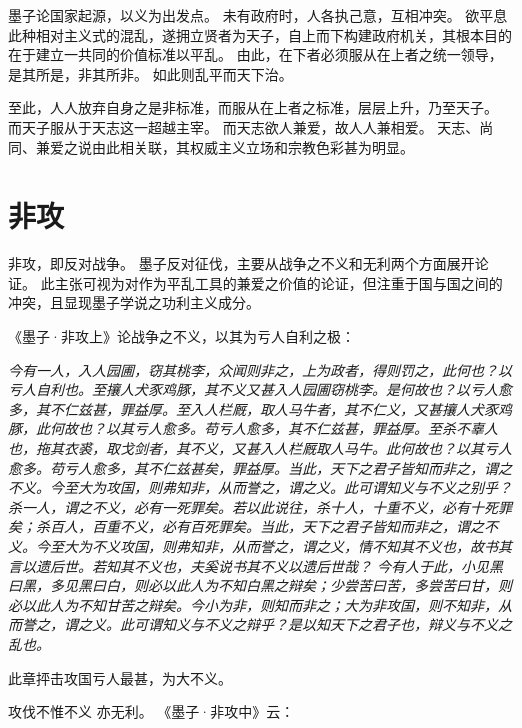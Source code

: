 \documentclass[11pt]{article}
\begin{document}
墨子论国家起源，以义为出发点。
未有政府时，人各执己意，互相冲突。
欲平息此种相对主义式的混乱，遂拥立贤者为天子，自上而下构建政府机关，其根本目的在于建立一共同的价值标准以平乱。
由此，在下者必须服从在上者之统一领导，是其所是，非其所非。
如此则乱平而天下治。

\par

至此，人人放弃自身之是非标准，而服从在上者之标准，层层上升，乃至天子。
而天子服从于天志这一超越主宰。
而天志欲人兼爱，故人人兼相爱。
天志、尚同、兼爱之说由此相关联，其权威主义立场和宗教色彩甚为明显。

\section{非攻}
非攻，即反对战争。
墨子反对征伐，主要从战争之不义和无利两个方面展开论证。
此主张可视为对作为平乱工具的兼爱之价值的论证，但注重于国与国之间的冲突，且显现墨子学说之功利主义成分。

\par

《墨子·非攻上》论战争之不义，以其为亏人自利之极：

\textit{今有一人，入人园圃，窃其桃李，众闻则非之，上为政者，得则罚之，此何也？以亏人自利也。至攘人犬豕鸡豚，其不义又甚入人园圃窃桃李。是何故也？以亏人愈多，其不仁兹甚，罪益厚。至入人栏厩，取人马牛者，其不仁义，又甚攘人犬豕鸡豚，此何故也？以其亏人愈多。苟亏人愈多，其不仁兹甚，罪益厚。至杀不辜人也，拖其衣裘，取戈剑者，其不义，又甚入人栏厩取人马牛。此何故也？以其亏人愈多。苟亏人愈多，其不仁兹甚矣，罪益厚。当此，天下之君子皆知而非之，谓之不义。今至大为攻国，则弗知非，从而誉之，谓之义。此可谓知义与不义之别乎？
\newline
杀一人，谓之不义，必有一死罪矣。若以此说往，杀十人，十重不义，必有十死罪矣；杀百人，百重不义，必有百死罪矣。当此，天下之君子皆知而非之，谓之不义。今至大为不义攻国，则弗知非，从而誉之，谓之义，情不知其不义也，故书其言以遗后世。若知其不义也，夫奚说书其不义以遗后世哉？ 今有人于此，小见黑曰黑，多见黑曰白，则必以此人为不知白黑之辩矣；少尝苦曰苦，多尝苦曰甘，则必以此人为不知甘苦之辩矣。今小为非，则知而非之；大为非攻国，则不知非，从而誉之，谓之义。此可谓知义与不义之辩乎？是以知天下之君子也，辩义与不义之乱也。}

此章抨击攻国亏人最甚，为大不义。

\par

攻伐不惟不义 亦无利。
《墨子·非攻中》云：
\end{document}
